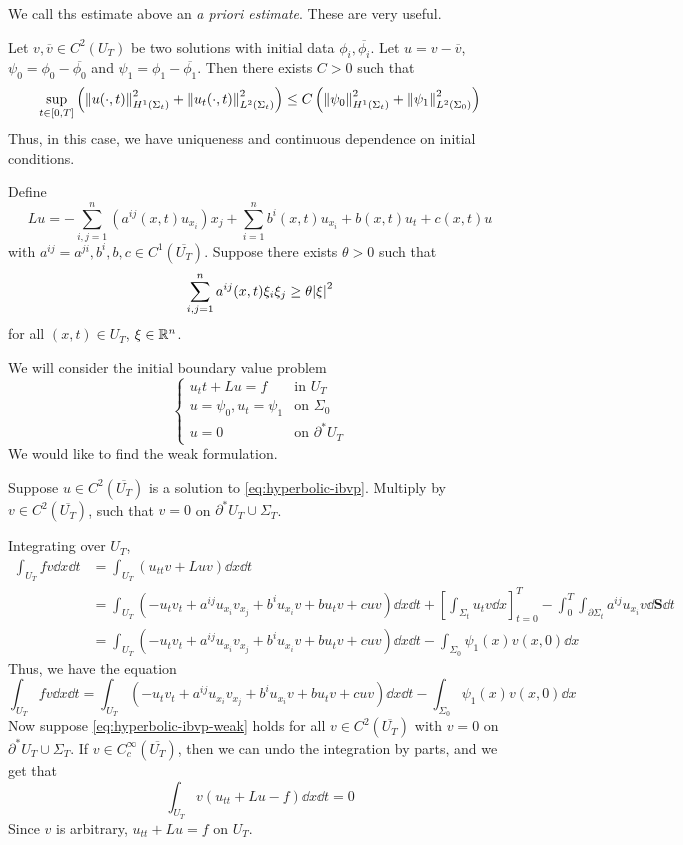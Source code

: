 \documentclass{article}
\begin{document}
\lec

We call ths estimate above an \emph{a priori estimate}. These are very useful.

Let \(v, \overline v \in C^2(U_T)\) be two solutions with initial data \(\phi_i, \overline{\phi_i}\). Let \(u = v - \overline{v}\), \(\psi_0 = \phi_0 - \overline{\phi_0}\) and \(\psi_1 = \phi_1 - \overline{\phi_1}\). Then there exists \(C > 0\) such that
\[\sup_{t \in [0, T]}\left(\norm{u(\cdot, t)}^2_{H^1(\Sigma_t)} + \norm{u_t(\cdot, t)}^2_{L^2(\Sigma_t)}\right) \le C\left(\norm{\psi_0}_{H^1(\Sigma_t)}^2 + \norm{\psi_1}_{L^2(\Sigma_0)}^2\right)\]
Thus, in this case, we have uniqueness and continuous dependence on initial conditions.

Define
\[Lu = -\sum_{i, j=1}^n(a^{ij}(x, t)u_{x_i})x_j + \sum_{i=1}^n b^i(x, t) u_{x_i} + b(x, t)u_t + c(x, t)u\]
with \(a^{ij} = a^{ji}, b^i, b, c \in C^1(\overline{U_T})\). Suppose there exists \(\theta > 0\) such that
\[\sum_{i, j=1}^n a^{ij}(x, t)\xi_i\xi_j \ge \theta\abs{\xi}^2\]
for all \((x, t) \in U_T\), \(\xi \in \mathbb{R}^n\).

We will consider the initial boundary value problem
\begin{equation}
    \label{eq:hyperbolic-ibvp}
    \begin{cases}
        u_tt + Lu = f & \text{in }U_T \\
        u = \psi_0, u_t = \psi_1 & \text{on }\Sigma_0 \\
        u = 0 &\text{on }\partial^*U_T
    \end{cases}
\end{equation}
We would like to find the weak formulation.

Suppose \(u \in C^2(\overline{U_T})\) is a solution to \cref{eq:hyperbolic-ibvp}. Multiply by \(v \in C^2(\overline{U_T})\), such that \(v = 0\) on \(\partial^*U_T \cup \Sigma_T\).

Integrating over \(U_T\),
\begin{align*}
    \int_{U_T}fv\dd x \dd t &= \int_{U_T} (u_{tt}v + Lu v) \dd x \dd t \\
    &= \int_{U_T}(-u_tv_t + a^{ij}u_{x_i}v_{x_j} + b^iu_{x_i}v + bu_t v + cuv)\dd x \dd t
    + \left[\int_{\Sigma_t}u_t v \dd x\right]_{t=0}^T - \int_{0}^T \int_{\partial\Sigma_t}a^{ij}u_{x_i}v \dd \textbf{S}\dd t \\
    &= \int_{U_T}(-u_tv_t + a^{ij}u_{x_i}v_{x_j} + b^iu_{x_i}v + bu_t v + cuv)\dd x \dd t - \int_{\Sigma_0}\psi_1(x)v(x, 0)\dd x
\end{align*}
Thus, we have the equation
\begin{equation}
    \label{eq:hyperbolic-ibvp-weak}
    \int_{U_T}fv\dd x \dd t = \int_{U_T}(-u_tv_t + a^{ij}u_{x_i}v_{x_j} + b^iu_{x_i}v + bu_t v + cuv)\dd x \dd t - \int_{\Sigma_0}\psi_1(x)v(x, 0)\dd x
\end{equation}
Now suppose \cref{eq:hyperbolic-ibvp-weak} holds for all \(v \in C^2(\overline{U_T})\) with \(v = 0\) on \(\partial^*U_T \cup \Sigma_T\). If \(v \in C_c^\infty(\overline{U_T})\), then we can undo the integration by parts, and we get that
\[\int_{U_T}v(u_{tt} + Lu - f)\dd x \dd t = 0\]
Since \(v\) is arbitrary, \(u_{tt} + Lu = f\) on \(U_T\).
\end{document}
